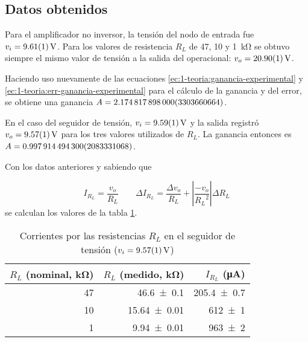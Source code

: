 \subsection{Datos obtenidos}

Para el amplificador no inversor, la tensión del nodo de entrada fue
$v_i = \SI{9.61 \pm 0.01}{\volt}$. Para los valores de resistencia 
$R_L$ de 47, 10 y \SI{1}{\kilo\ohm} se obtuvo siempre el mismo valor de
tensión a la salida del operacional: $v_o = \SI{20.90 \pm 0.01}{\volt}$.

Haciendo uso nuevamente de las ecuaciones \ref{ec:1-teoria:ganancia-experimental} y 
\ref{ec:1-teoria:err-ganancia-experimental} para el cálculo de la ganancia y del error, se
obtiene una ganancia $A = \num{2.174817898 \pm 0.003303660664}$.

En el caso del seguidor de tensión, $v_i = \SI{9.59 \pm 0.01}{\volt}$
y la salida registró $v_o = \SI{9.57 \pm 0.01}{\volt}$ para los tres valores
utilizados de $R_L$. La ganancia entonces es 
$A = \num{0.9979144943 \pm 0.002083331068}$.

Con los datos anteriores y sabiendo que

\[
    I_{R_L} = \frac{v_o}{R_L} \quad\quad
    \Delta I_{R_L} = \frac{\Delta v_o}{R_L} + 
                     \left| \frac{-v_o}{{R_L}^2} \right| \Delta R_L 
\]
se calculan los valores de la tabla \ref{tab:2-datos:irl}.

\begin{table}[H]
    \centering
    \begin{tabular}{@{}r|rr@{}}
        \toprule
        $R_L$ (nominal, \si{\kilo\ohm}) & $R_L$ (medido, \si{\kilo\ohm}) & $I_{R_L}$
            (\si{\micro\ampere}) \\
        \midrule
        47 & \num{46.6 \pm 0.1} & \num{205.4 \pm 0.7} \\
        10 & \num{15.64 \pm 0.01} & \num{612 \pm 1} \\
         1 & \num{9.94 \pm 0.01} & \num{963 \pm 2} \\ \bottomrule
    \end{tabular}
    \caption{Corrientes por las resistencias $R_L$ en el seguidor de tensión
    ($v_i = \SI{9.57 \pm 0.01}{\volt}$)}
    \label{tab:2-datos:irl}
\end{table}
